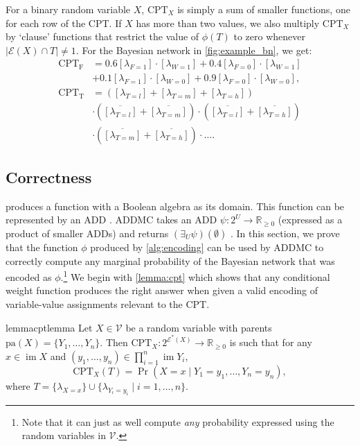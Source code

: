 \documentclass{uai2021} %
\theoremstyle{definition}
\DeclareMathOperator{\im}{im}
\begin{document}
For a binary random variable $X$, $\mathrm{CPT}_X$ is simply a sum of smaller
functions, one for each row of the CPT. If $X$ has more than two values, we also
multiply $\mathrm{CPT}_X$ by `clause' functions that restrict the value of
$\phi(T)$ to zero whenever $|\mathcal{E}(X) \cap T| \ne 1$. For the Bayesian
network in \cref{fig:example_bn}, we get:
\begin{align*}
  \mathrm{CPT_F} &= 0.6[\lambda_{F=1}] \cdot [\lambda_{W=1}] + 0.4[\lambda_{F=0}] \cdot [\lambda_{W=1}] \\
                 &+ 0.1[\lambda_{F=1}] \cdot [\lambda_{W=0}] + 0.9[\lambda_{F=0}] \cdot [\lambda_{W=0}], \\
  \mathrm{CPT_T} &= ([\lambda_{T=l}] + [\lambda_{T=m}] + [\lambda_{T=h}]) \\
                 &\cdot (\overline{[\lambda_{T=l}]} + \overline{[\lambda_{T=m}]}) \cdot (\overline{[\lambda_{T=l}]} + \overline{[\lambda_{T=h}]}) \\
                 &\cdot (\overline{[\lambda_{T=m}]} + \overline{[\lambda_{T=h}]}) \cdot \dots.
\end{align*}

\subsection{Correctness}

 produces a function with a Boolean algebra as its domain.
This function can be represented by an ADD
\citep{DBLP:journals/fmsd/BaharFGHMPS97}. \textsf{ADDMC} takes an ADD
$\psi\colon 2^{U} \to \mathbb{R}_{\ge 0}$ (expressed as a product of smaller
ADDs) and returns $(\exists_U\psi)(\emptyset)$ \citep{DBLP:conf/aaai/DudekPV20}.
In this section, we prove that the function $\phi$ produced by
\cref{alg:encoding} can be used by \textsf{ADDMC} to correctly compute any
marginal probability of the Bayesian network that was encoded as
$\phi$.\footnote{Note that it can just as well compute \emph{any} probability
  expressed using the random variables in $\mathcal{V}$.} We begin with
\cref{lemma:cpt} which shows that any conditional weight function produces the
right answer when given a valid encoding of variable-value assignments relevant
to the CPT.

\begin{restatable}{lemma}{cptlemma} \label{lemma:cpt}
  Let $X \in \mathcal{V}$ be a random variable with parents $\mathrm{pa}(X) = \{ Y_1,
  \dots, Y_n \}$. Then $\mathrm{CPT}_X\colon 2^{\mathcal{E}^*(X)} \to
  \mathbb{R}_{\ge 0}$ is such that for any $x \in \im X$ and $(y_1, \dots, y_n)
  \in \prod_{i=1}^n \im Y_i$,
  \[
    \mathrm{CPT}_X (T) = \Pr(X = x \mid Y_1 = y_1, \dots, Y_n = y_n),
  \]
  where $T = \{ \lambda_{X=x} \} \cup \{ \lambda_{Y_i=y_i} \mid i = 1, \dots, n
  \}$.
\end{restatable}
\end{document}
